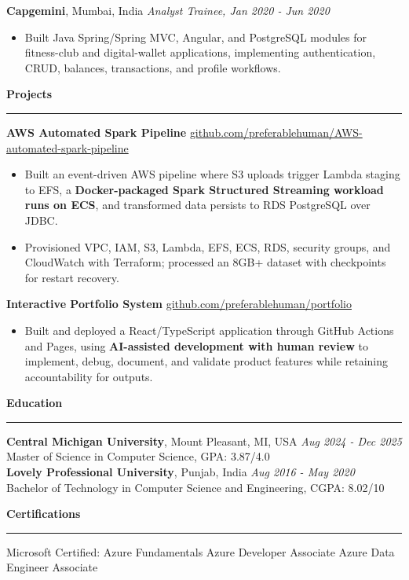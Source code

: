 \documentclass[11pt,letterpaper]{article}
\newcommand{\ressection}[1]{\Needspace{6\baselineskip}\vspace{8pt}\par\textbf{#1}\par\vspace{2pt}\hrule\vspace{5pt}}
\begin{document}
\textbf{Capgemini}, Mumbai, India \hfill \textit{Analyst Trainee, Jan 2020 - Jun 2020}
\begin{itemize}
  \item Built Java Spring/Spring MVC, Angular, and PostgreSQL modules for fitness-club and digital-wallet applications, implementing authentication, CRUD, balances, transactions, and profile workflows.
\end{itemize}

\ressection{Projects}
\textbf{AWS Automated Spark Pipeline} \hfill \href{https://github.com/preferablehuman/AWS-automated-spark-pipeline}{github.com/preferablehuman/AWS-automated-spark-pipeline}
\begin{itemize}
  \item Built an event-driven AWS pipeline where S3 uploads trigger Lambda staging to EFS, a \textbf{Docker-packaged Spark Structured Streaming workload runs on ECS}, and transformed data persists to RDS PostgreSQL over JDBC.
  \item Provisioned VPC, IAM, S3, Lambda, EFS, ECS, RDS, security groups, and CloudWatch with Terraform; processed an 8GB+ dataset with checkpoints for restart recovery.
\end{itemize}
\vspace{2pt}
\textbf{Interactive Portfolio System} \hfill \href{https://github.com/preferablehuman/portfolio}{github.com/preferablehuman/portfolio}
\begin{itemize}
  \item Built and deployed a React/TypeScript application through GitHub Actions and Pages, using \textbf{AI-assisted development with human review} to implement, debug, document, and validate product features while retaining accountability for outputs.
\end{itemize}

\ressection{Education}
\textbf{Central Michigan University}, Mount Pleasant, MI, USA \hfill \textit{Aug 2024 - Dec 2025}\\
Master of Science in Computer Science, GPA: 3.87/4.0\\
\textbf{Lovely Professional University}, Punjab, India \hfill \textit{Aug 2016 - May 2020}\\
Bachelor of Technology in Computer Science and Engineering, CGPA: 8.02/10

\ressection{Certifications}
Microsoft Certified: Azure Fundamentals \textbar{} Azure Developer Associate \textbar{} Azure Data Engineer Associate
\end{document}
